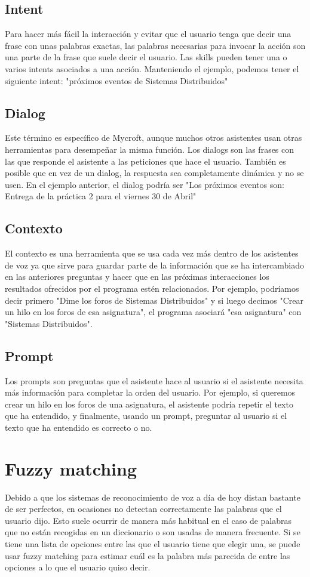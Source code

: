 \subsection{Intent}
Para hacer más fácil la interacción y evitar que el usuario tenga que decir una frase con unas palabras exactas, las palabras necesarias para invocar la acción son una parte de la frase que suele decir el usuario. Las skills pueden tener una o varios intents asociados a una acción. Manteniendo el ejemplo, podemos tener el siguiente intent: "próximos eventos de Sistemas Distribuidos"

\subsection{Dialog}
Este término es específico de Mycroft, aunque muchos otros asistentes usan otras herramientas para desempeñar la misma función. Los dialogs son las frases con las que responde el asistente a las peticiones que hace el usuario. También es posible que en vez de un dialog, la respuesta sea completamente dinámica y no se usen. En el ejemplo anterior, el dialog podría ser "Los próximos eventos son: Entrega de la práctica 2 para el viernes 30 de Abril"

\subsection{Contexto}
El contexto es una herramienta que se usa cada vez más dentro de los asistentes de voz ya que sirve para guardar parte de la información que se ha intercambiado en las anteriores preguntas y hacer que en las próximas interacciones los resultados ofrecidos por el programa estén relacionados. Por ejemplo, podríamos decir primero "Dime los foros de Sistemas Distribuidos" y si luego decimos "Crear un hilo en los foros de esa asignatura", el programa asociará "esa asignatura" con "Sistemas Distribuidos".

\subsection{Prompt}
Los prompts son preguntas que el asistente hace al usuario si el asistente necesita más información para completar la orden del usuario. Por ejemplo, si queremos crear un hilo en los foros de una asignatura, el asistente podría repetir el texto que ha entendido, y finalmente, usando un prompt, preguntar al usuario si el texto que ha entendido es correcto o no.

\section{Fuzzy matching}
Debido a que los sistemas de reconocimiento de voz a día de hoy distan bastante de ser perfectos, en ocasiones no detectan correctamente las palabras que el usuario dijo. Esto suele ocurrir de manera más habitual en el caso de palabras que no están recogidas en un diccionario o son usadas de manera frecuente. Si se tiene una lista de opciones entre las que el usuario tiene que elegir una, se puede usar fuzzy matching para estimar cuál es la palabra más parecida de entre las opciones a lo que el usuario quiso decir.